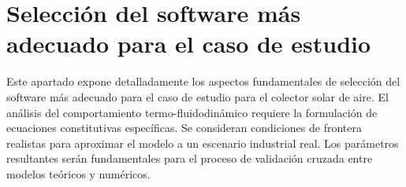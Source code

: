 \section{Selección del software más adecuado para el caso de estudio}
\label{sec:cap08_seleccion}

Este apartado expone detalladamente los aspectos fundamentales de selección del software más adecuado para el caso de estudio para el colector solar de aire.
El análisis del comportamiento termo-fluidodinámico requiere la formulación de ecuaciones constitutivas específicas.
Se consideran condiciones de frontera realistas para aproximar el modelo a un escenario industrial real.
Los parámetros resultantes serán fundamentales para el proceso de validación cruzada entre modelos teóricos y numéricos.
